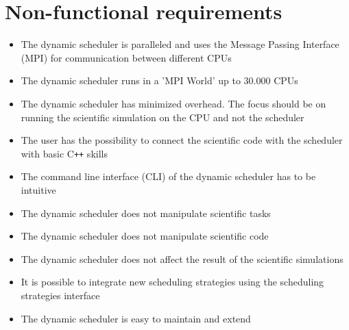 {
\setcounter{funcNFR}{10}
\renewcommand{\labelitemi}{
	\ifnum \value{funcNFR}<10$/NF 0\arabic{funcNFR} /$\addtocounter{funcNFR}{10}
	\else $/NF \arabic{funcNFR} /$\addtocounter{funcNFR}{10}\fi
}

\section{Non-functional requirements}
	\begin{itemize}
		\item The dynamic scheduler is paralleled and uses the Message Passing Interface (MPI) for communication between different CPUs
		\item The dynamic scheduler runs in a 'MPI World' up to 30.000 CPUs
		\item The dynamic scheduler has minimized overhead. The focus should be on running the scientific simulation on the CPU and not the scheduler
		\item The user has the possibility to connect the scientific code with the scheduler with basic C\texttt{++} skills%
		\item The command line interface (CLI) of the dynamic scheduler has to be intuitive
		\item The dynamic scheduler does not manipulate scientific tasks
		\item The dynamic scheduler does not manipulate scientific code
		\item The dynamic scheduler does not affect the result of the scientific simulations
		\item It is possible to integrate new scheduling strategies using the scheduling strategies interface
		\item The dynamic scheduler is easy to maintain and extend
	\end{itemize}
}